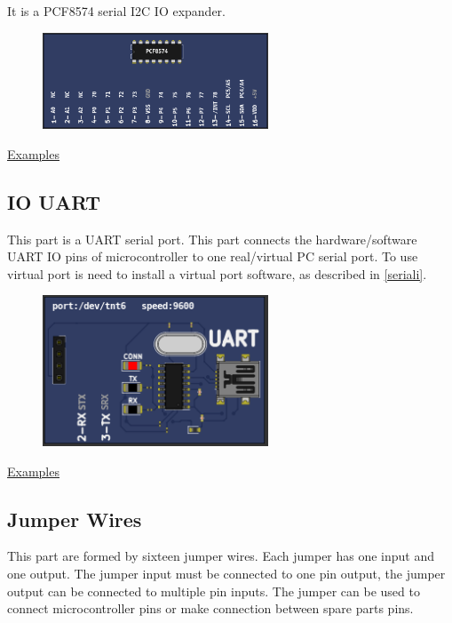 It is a PCF8574 serial I2C IO expander.

\begin{figure}[H]
\center
\includegraphics[width=0.6\textwidth]{img/part_pcf8574.png} 
\end{figure} 

\href{https://lcgamboa.github.io/picsimlab_examples/examples/examples_index.html\#IO\_PCF8574}{Examples}


\subsection{IO UART}

This part is a UART serial port. This part connects the hardware/software UART IO pins of microcontroller to
one real/virtual PC serial port. To use virtual port is need to install a virtual port software, as described in \ref{seriali}. 

\begin{figure}[H]
\center
\includegraphics[width=0.6\textwidth]{img/part_uart.png} 
\end{figure} 

\href{https://lcgamboa.github.io/picsimlab_examples/examples/examples_index.html\#IO\_UART}{Examples}


\subsection{Jumper Wires}

This part are formed by sixteen jumper wires. Each jumper has one input and one output.  The jumper input must be connected to one pin output, 
the jumper output can be connected to multiple pin inputs. The jumper can be used to connect microcontroller pins or make connection between 
spare parts pins.   

